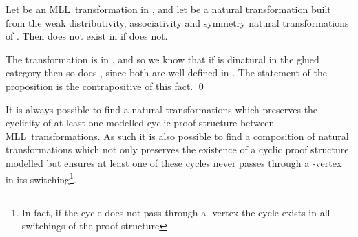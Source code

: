 \documentclass{LMCS}
\theoremstyle{plain}\newtheorem*{cLm}{Claim}
\newcommand{\mll}{MLL} \newcommand{\mall}{MALL}
\newcommand{\hugh}[1]{#1}
\begin{document}
    \begin{prop} \label{MDNFtoMLLProp}
    Let  be an \mll~transformation in , and let  be a natural transformation built from the weak distributivity, associativity and symmetry natural transformations of . Then  does not exist \hugh{in}  if  does not.
    \end{prop}
    \proof
    The transformation  is in , and so we know that if  is dinatural in the glued category then so does , since both are well-defined in . The statement of the proposition is the contrapositive of this fact. \qed
    
    It is always possible to find a natural
    transformations which preserves the cyclicity of at least one
    modelled cyclic proof structure between \mll~transformations. As such it is also possible to find a composition of natural transformations which not only preserves the existence of a cyclic proof structure modelled but ensures at least one of these cycles never passes through a -vertex in its switching\footnote{In fact, if the cycle does not pass through a -vertex the cycle exists in all switchings of the proof structure}.
    
\end{document}

